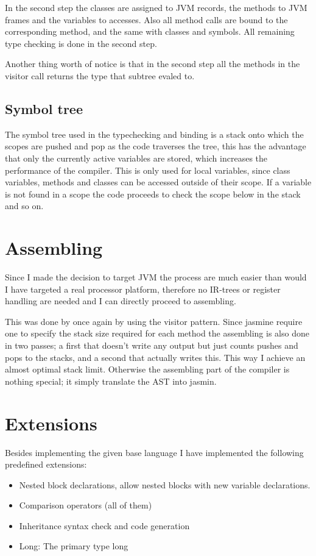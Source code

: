 \documentclass[a4paper,11pt]{article}
\begin{document}
  In the second step the classes are assigned to JVM records, the methods to JVM frames and the variables to accesses. Also all method calls are bound to the corresponding method, and the same with classes and symbols.
  All remaining type checking is done in the second step.

  Another thing worth of notice is that in the second step all the methods in the visitor call returns the type that subtree evaled to.

  \subsection{Symbol tree}
  The symbol tree used in the typechecking and binding is a stack onto which the scopes are pushed and pop as the code traverses the tree, this has the advantage that only the currently active variables are
  stored, which increases the performance of the compiler. This is only used for local variables, since class variables, methods and classes can be accessed outside of their scope. If a variable is not found in a scope
  the code proceeds to check the scope below in the stack and so on.

  \section{Assembling}
  Since I made the decision to target JVM the process are much easier than would I have targeted a real processor platform, therefore no IR-trees or register handling are needed and I can directly proceed to assembling.

  This was done by once again by using the visitor pattern. Since jasmine require one to specify the stack size required for each method the assembling is also done in two passes; a first that doesn't write any output but just counts pushes and pops to the stacks,
  and a second that actually writes this. This way I achieve an almost optimal stack limit. Otherwise the assembling part of the compiler is nothing special; it simply translate the AST into jasmin.

  \section{Extensions}
  Besides implementing the given base language I have implemented the following predefined extensions:
  \begin{itemize}
     \item Nested block declarations, allow nested blocks with new variable declarations.
     \item Comparison operators (all of them)
     \item Inheritance syntax check and code generation
     \item Long: The primary type long
  \end{itemize}
\end{document}
